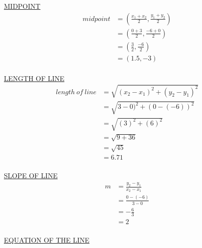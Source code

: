 \documentclass{article}
\begin{document}
\begin{description}
        \underline{MIDPOINT}
        $$
            \begin{aligned}
                midpoint & = (\frac{x_1+x_2}{2}, \frac{y_1+y_2}{2}) \\
                         & = (\frac{0+3}{2}, \frac{-6+0}{2})        \\
                         & = (\frac{3}{2}, \frac{-6}{2})            \\
                         & = (1.5, -3)                              \\
            \end{aligned}
        $$

        \underline{LENGTH OF LINE}
        $$
            \begin{aligned}
                length \ of \ line & = \sqrt{(x_2-x_1)^2 + (y_2-y_1)^2} \\
                                   & = \sqrt{3-0)^2 + (0-(-6))^2}       \\
                                   & = \sqrt{(3)^2 + (6)^2}             \\
                                   & = \sqrt{9 + 36}                    \\
                                   & = \sqrt{45}                        \\
                                   & = 6.71                             \\
            \end{aligned}
        $$

        \underline{SLOPE OF LINE}
        $$
            \begin{aligned}
                m & = \frac{y_2-y_1}{x_2-x_1} \\
                  & = \frac{0-(-6)}{3-0}      \\
                  & = -\frac{6}{3}            \\
                  & = 2                       \\
            \end{aligned}
        $$

        \underline{EQUATION OF THE LINE}


\end{description}
\end{document}
